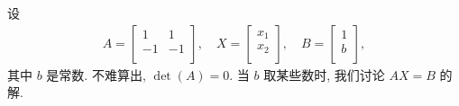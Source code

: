 \begin{example}
    设
    \begin{align*}
        A = \begin{bmatrix}
                1  & 1  \\
                -1 & -1 \\
            \end{bmatrix},
        \quad
        X =
        \begin{bmatrix}
            x_1 \\
            x_2 \\
        \end{bmatrix},
        \quad
        B =
        \begin{bmatrix}
            1 \\
            b \\
        \end{bmatrix},
    \end{align*}
    其中 \(b\) 是常数.
    不难算出, \(\det {(A)} = 0\).
    当 \(b\) 取某些数时,
    我们讨论 \(AX = B\) 的解.


\end{example}
